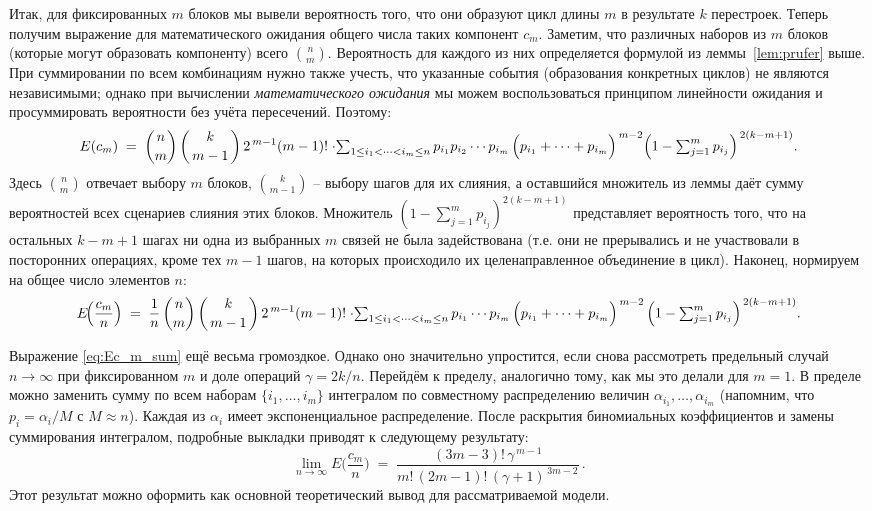 Итак, для фиксированных $m$ блоков мы вывели вероятность того, что они образуют цикл длины $m$ в результате $k$ перестроек. Теперь получим выражение для математического ожидания общего числа таких компонент $c_m$. Заметим, что различных наборов из $m$ блоков (которые могут образовать компоненту) всего $\binom{n}{m}$. Вероятность для каждого из них определяется формулой из леммы~\ref{lem:prufer} выше. При суммировании по всем комбинациям нужно также учесть, что указанные события (образования конкретных циклов) не являются независимыми; однако при вычислении \emph{математического ожидания} мы можем воспользоваться принципом линейности ожидания и просуммировать вероятности без учёта пересечений. Поэтому:
\[
E(c_m) \;=\; \binom{n}{m}\, \binom{k}{\,m-1\,}\, 2^{\,m-1}(m-1)!\; \cdot $$ $$ \sum_{1\le i_1 < \cdots < i_m \le n} p_{i_1} p_{i_2} \cdots p_{i_m}\, \Big(p_{i_1} + \cdots + p_{i_m}\Big)^{\,m-2} \Big(1 - \sum_{j=1}^m p_{i_j}\Big)^{\,2(k-m+1)}. 
\] 
Здесь $\binom{n}{m}$ отвечает выбору $m$ блоков, $\binom{k}{m-1}$ -- выбору шагов для их слияния, а оставшийся множитель из леммы даёт сумму вероятностей всех сценариев слияния этих блоков. Множитель $(1 - \sum_{j=1}^m p_{i_j})^{2(k-m+1)}$ представляет вероятность того, что на остальных $k-m+1$ шагах ни одна из выбранных $m$ связей не была задействована (т.е. они не прерывались и не участвовали в посторонних операциях, кроме тех $m-1$ шагов, на которых происходило их целенаправленное объединение в цикл). Наконец, нормируем на общее число элементов $n$:
\begin{equation}\label{eq:Ec_m_sum}
E\!\Big(\frac{c_m}{n}\Big) \;=\; \frac{1}{n}\, \binom{n}{m}\, \binom{k}{\,m-1\,}\, 2^{\,m-1}(m-1)!\; \cdot $$ $$ \sum_{1\le i_1 < \cdots < i_m \le n} p_{i_1} \cdots p_{i_m}\, \Big(p_{i_1} + \cdots + p_{i_m}\Big)^{\,m-2}\, \Big(1 - \sum_{j=1}^m p_{i_j}\Big)^{\,2(k-m+1)}.
\end{equation}

Выражение \eqref{eq:Ec_m_sum} ещё весьма громоздкое. Однако оно значительно упростится, если снова рассмотреть предельный случай $n \to \infty$ при фиксированном $m$ и доле операций $\gamma = 2k/n$. Перейдём к пределу, аналогично тому, как мы это делали для $m=1$. В пределе можно заменить сумму по всем наборам $\{i_1,\dots,i_m\}$ интегралом по совместному распределению величин $\alpha_{i_1},\dots,\alpha_{i_m}$ (напомним, что $p_i = \alpha_i / M$ с $M \approx n$). Каждая из $\alpha_i$ имеет экспоненциальное распределение. После раскрытия биномиальных коэффициентов и замены суммирования интегралом, подробные выкладки приводят к следующему результату:
\[
\lim_{n\to\infty} E\!\Big(\frac{c_m}{n}\Big) \;=\; \frac{(3m-3)!\, \gamma^{\,m-1}}{m!\, (2m-1)! \, (\gamma+1)^{\,3m-2}}\,.
\]
Этот результат можно оформить как основной теоретический вывод для рассматриваемой модели.

